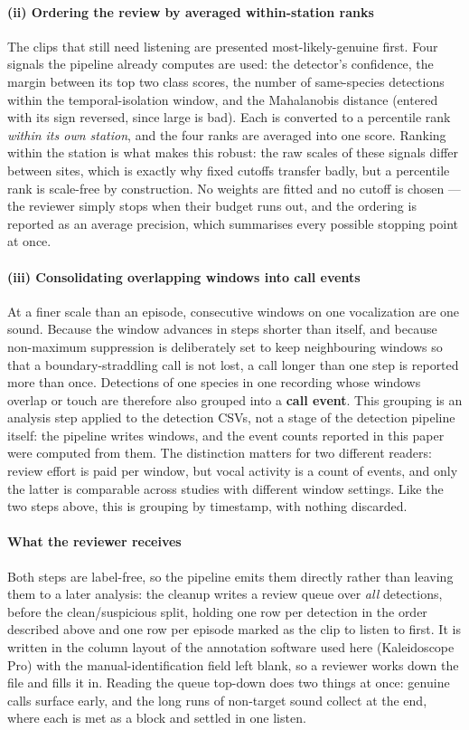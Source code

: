 \documentclass[review,3p,times]{elsarticle}
\begin{document}
\paragraph{(ii) Ordering the review by averaged within-station ranks}
The clips that still need listening are presented most-likely-genuine first.
Four signals the pipeline already computes are used: the detector's confidence,
the margin between its top two class scores, the number of same-species
detections within the temporal-isolation window, and the Mahalanobis distance
(entered with its sign reversed, since large is bad). Each is converted to a
percentile rank \emph{within its own station}, and the four ranks are averaged
into one score. Ranking within the station is what makes this robust: the raw
scales of these signals differ between sites, which is exactly why fixed
cutoffs transfer badly, but a percentile rank is scale-free by construction.
No weights are fitted and no cutoff is chosen --- the reviewer simply stops when
their budget runs out, and the ordering is reported as an average precision,
which summarises every possible stopping point at once.

\paragraph{(iii) Consolidating overlapping windows into call events}
At a finer scale than an episode, consecutive windows on one vocalization are one
sound. Because the window advances in steps shorter than itself, and because
non-maximum suppression is deliberately set to keep neighbouring windows so that
a boundary-straddling call is not lost, a call longer than one step is reported
more than once. Detections of one species in one recording whose windows overlap
or touch are therefore also grouped into a \textbf{call event}. This grouping
is an analysis step applied to the detection CSVs, not a stage of the detection
pipeline itself: the pipeline writes windows, and the event counts reported in
this paper were computed from them. The distinction matters for two
different readers: review effort is paid per window, but vocal activity is a
count of events, and only the latter is comparable across studies with different
window settings. Like the two steps above, this is grouping by timestamp, with
nothing discarded.

\paragraph{What the reviewer receives}
Both steps are label-free, so the pipeline emits them directly rather than
leaving them to a later analysis: the cleanup writes a review queue over
\emph{all} detections, before the clean/suspicious split, holding one row per
detection in the order described above and one row per episode marked as the
clip to listen to first. It is written in the column layout of the annotation
software used here (Kaleidoscope Pro) with the manual-identification field left
blank, so a reviewer works down the file and fills it in. Reading the queue
top-down does two things at once: genuine calls surface early, and the long runs
of non-target sound collect at the end, where each is met as a block and settled
in one listen.
\end{document}

